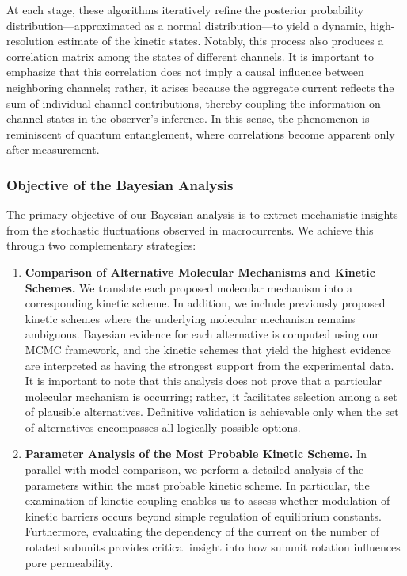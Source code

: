 \documentclass[9pt]{elife}
\begin{document}
	At each stage, these algorithms iteratively refine the posterior probability distribution—approximated as a normal distribution—to yield a dynamic, high-resolution estimate of the kinetic states. Notably, this process also produces a correlation matrix among the states of different channels. It is important to emphasize that this correlation does not imply a causal influence between neighboring channels; rather, it arises because the aggregate current reflects the sum of individual channel contributions, thereby coupling the information on channel states in the observer’s inference. In this sense, the phenomenon is reminiscent of quantum entanglement, where correlations become apparent only after measurement.
	\subsubsection{Objective of the Bayesian Analysis}
	The primary objective of our Bayesian analysis is to extract mechanistic insights from the stochastic fluctuations observed in macrocurrents. We achieve this through two complementary strategies:
	
	\begin{enumerate}[label=\textbf{\arabic*.}]
		\item \textbf{Comparison of Alternative Molecular Mechanisms and Kinetic Schemes.}  
		We translate each proposed molecular mechanism into a corresponding kinetic scheme. In addition, we include previously proposed kinetic schemes where the underlying molecular mechanism remains ambiguous. Bayesian evidence for each alternative is computed using our MCMC framework, and the kinetic schemes that yield the highest evidence are interpreted as having the strongest support from the experimental data. It is important to note that this analysis does not prove that a particular molecular mechanism is occurring; rather, it facilitates selection among a set of plausible alternatives. Definitive validation is achievable only when the set of alternatives encompasses all logically possible options.
		
		\item \textbf{Parameter Analysis of the Most Probable Kinetic Scheme.}  
		In parallel with model comparison, we perform a detailed analysis of the parameters within the most probable kinetic scheme. In particular, the examination of kinetic coupling enables us to assess whether modulation of kinetic barriers occurs beyond simple regulation of equilibrium constants. Furthermore, evaluating the dependency of the current on the number of rotated subunits provides critical insight into how subunit rotation influences pore permeability.
	\end{enumerate}
	
\end{document}
